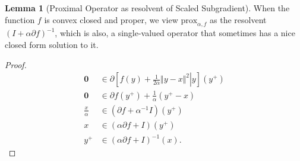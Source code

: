 \documentclass[]{article}
\theoremstyle{definition}
\newtheorem{lemma}{Lemma}[subsection]  %
\begin{document}
        \begin{lemma}[Proximal Operator as resolvent of Scaled Subgradient]\label{lemma:prox_alternative_form}
            When the function $f$ is convex closed and proper, we view $\text{prox}_{\alpha, f}$ as the resolvent $(I + \alpha \partial f)^{-1}$, which is also, a single-valued operator that sometimes has a nice closed form solution to it.
        \end{lemma}
        \begin{proof}
            \begin{align*}
                \mathbf 0 &\in \partial
                \left[
                    \left.
                        f(y) + \frac{1}{2\alpha} \Vert y - x\Vert^2 
                    \right| y
                \right](y^+)
                \\
                \mathbf 0 &\in \partial f(y^+) + \frac{1}{\alpha}(y^+ - x)
                \\
                \frac{x}{\alpha} &\in 
                (\partial f + \alpha^{-1}I)(y^+)
                \\
                x &\in 
                (\alpha \partial f + I)(y^+)
                \\
                y^+ &\in (\alpha\partial f+ I)^{-1}(x).
            \end{align*}
        \end{proof}
\end{document}
